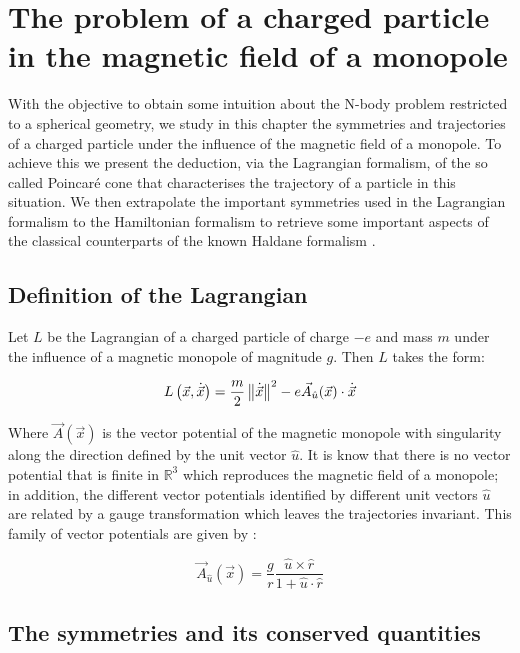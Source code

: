\chapter{The problem of a charged particle in the magnetic field of a monopole}

With the objective to obtain some intuition about the N-body problem restricted to a spherical geometry, we study in this chapter the symmetries and trajectories of a charged particle under the influence of the magnetic field of a monopole. To achieve this we present the deduction, via the Lagrangian formalism, of the so called Poincar\'e cone \cite{poincare} that characterises the trajectory of a particle in this situation. We then extrapolate the important symmetries used in the Lagrangian formalism to the Hamiltonian formalism to retrieve some important aspects of the classical counterparts of the known Haldane formalism \cite{haldane}.\\

\section{Definition of the Lagrangian}
Let $L$ be the Lagrangian of a charged particle of charge $-e$ and mass $m$ under the influence of a magnetic monopole of magnitude $g$. Then $L$ takes the form:

\begin{equation}
L\left( \vec{x},\dot{\vec{x}} \right) = \frac{m}{2}\left\lVert \dot{\vec{x}} \right\rVert^2 - e\vec{A}_{\hat{u}}(\vec{x})\cdot\dot{\vec{x}}
\label{eq:lagrangian}
\end{equation}

Where $\vec{A}(\vec{x})$ is the vector potential of the magnetic monopole with singularity along the direction defined by the unit vector $\hat{u}$. It is know that there is no vector potential that is finite in $\mathbb{R}^3$ which reproduces the magnetic field of a monopole; in addition, the different vector potentials identified by different unit vectors $\hat{u}$ are related by a gauge transformation which leaves the trajectories invariant. This family of vector potentials are given by \cite{vectorPotentials}:

\begin{equation}
\vec{A}_{\hat{u}}(\vec{x}) = \frac{g}{r}\frac{\hat{u}\times\hat{r}}{1+\hat{u}\cdot\hat{r}}
\label{eq:monopolepotential}
\end{equation}

\section{The symmetries and its conserved quantities}

